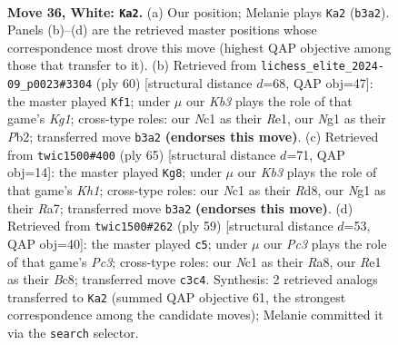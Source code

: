 \documentclass[11pt]{article}
\begin{document}
\clearpage

\begin{figure}[p]\centering
\begin{subfigure}{0.46\textwidth}\centering
\resizebox{\linewidth}{!}{%
\newchessgame
\chessboard[
  setfen={5r2/4r1k1/1p6/p1p1nb2/P5p1/1KP5/6PP/2N1RBNR w - - 0 36},
  showmover=false,
  pgfstyle=straightmove, color=movearrow, markmove={b3-a2}
]}
\caption{}
\end{subfigure}\hfill
\begin{subfigure}{0.46\textwidth}\centering
\resizebox{\linewidth}{!}{%
\newchessgame
\chessboard[
  setfen={3r1bk1/6p1/r5pp/p1n1B3/1p1N4/1P5P/1P3PP1/3RR1K1 w - - 1 31},
  showmover=false,
  pgfstyle=straightmove, color=movearrow, markmove={g1-f1}
]}
\caption{}
\end{subfigure}
\\[4pt]
\begin{subfigure}{0.46\textwidth}\centering
\resizebox{\linewidth}{!}{%
\newchessgame
\chessboard[
  setfen={3r3k/r4pp1/n2Np2p/R3P2b/5P2/8/P1B3P1/2R3K1 b - - 0 33},
  showmover=false,
  pgfstyle=straightmove, color=movearrow, markmove={h8-g8}
]}
\caption{}
\end{subfigure}\hfill
\begin{subfigure}{0.46\textwidth}\centering
\resizebox{\linewidth}{!}{%
\newchessgame
\chessboard[
  setfen={r1b1rk2/pp3p2/2p2P2/8/3nB1Np/7P/PP4P1/3RR1K1 b - - 1 30},
  showmover=false,
  pgfstyle=straightmove, color=movearrow, markmove={c6-c5}
]}
\caption{}
\end{subfigure}
\caption{\textbf{Move 36, White: \texttt{Ka2}.} (a) Our position; Melanie plays \texttt{Ka2} (\texttt{b3a2}). Panels (b)--(d) are the retrieved master positions whose correspondence most drove this move (highest QAP objective among those that transfer to it). (b) Retrieved from \texttt{lichess\_elite\_2024-09\_p0023\#3304} (ply 60) [structural distance $d$=68, QAP obj=47]: the master played \texttt{Kf1}; under $\mu$ our \emph{Kb3} plays the role of that game's \emph{Kg1}; cross-type roles: our \emph{N}c1 as their \emph{R}e1, our \emph{N}g1 as their \emph{P}b2; transferred move \texttt{b3a2} \textbf{(endorses this move)}. (c) Retrieved from \texttt{twic1500\#400} (ply 65) [structural distance $d$=71, QAP obj=14]: the master played \texttt{Kg8}; under $\mu$ our \emph{Kb3} plays the role of that game's \emph{Kh1}; cross-type roles: our \emph{N}c1 as their \emph{R}d8, our \emph{N}g1 as their \emph{R}a7; transferred move \texttt{b3a2} \textbf{(endorses this move)}. (d) Retrieved from \texttt{twic1500\#262} (ply 59) [structural distance $d$=53, QAP obj=40]: the master played \texttt{c5}; under $\mu$ our \emph{Pc3} plays the role of that game's \emph{Pc3}; cross-type roles: our \emph{N}c1 as their \emph{R}a8, our \emph{R}e1 as their \emph{B}c8; transferred move \texttt{c3c4}. Synthesis: 2 retrieved analogs transferred to \texttt{Ka2} (summed QAP objective 61, the strongest correspondence among the candidate moves); Melanie committed it via the \texttt{search} selector.}
\label{fig:thought-m70}
\end{figure}
\end{document}
